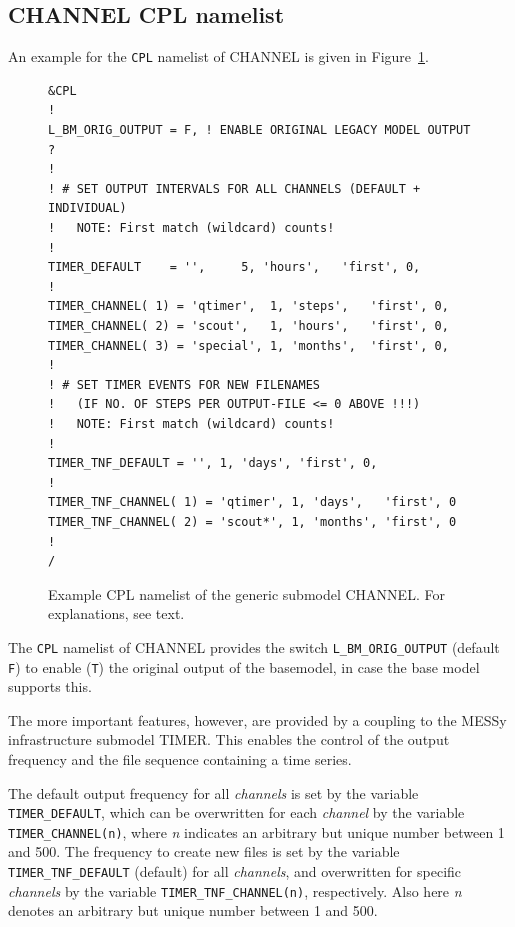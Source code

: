\documentclass[twoside]{article}
\begin{document}
\subsection{CHANNEL CPL namelist}
\label{sec:channelCPL}
%
An example for the {\tt CPL} namelist of CHANNEL is given in
Figure~\ref{fig:channel_cpl}.
%

\begin{figure}[h!]
\begin{center}
\begin{minipage}{0.6\textwidth}
\footnotesize
\begin{verbatim}
&CPL
!
L_BM_ORIG_OUTPUT = F, ! ENABLE ORIGINAL LEGACY MODEL OUTPUT ?
!
! # SET OUTPUT INTERVALS FOR ALL CHANNELS (DEFAULT + INDIVIDUAL)
!   NOTE: First match (wildcard) counts!
!
TIMER_DEFAULT    = '',     5, 'hours',   'first', 0,
!
TIMER_CHANNEL( 1) = 'qtimer',  1, 'steps',   'first', 0,
TIMER_CHANNEL( 2) = 'scout',   1, 'hours',   'first', 0,
TIMER_CHANNEL( 3) = 'special', 1, 'months',  'first', 0,
!
! # SET TIMER EVENTS FOR NEW FILENAMES
!   (IF NO. OF STEPS PER OUTPUT-FILE <= 0 ABOVE !!!)
!   NOTE: First match (wildcard) counts!
!
TIMER_TNF_DEFAULT = '', 1, 'days', 'first', 0,
!
TIMER_TNF_CHANNEL( 1) = 'qtimer', 1, 'days',   'first', 0
TIMER_TNF_CHANNEL( 2) = 'scout*', 1, 'months', 'first', 0
!
/
\end{verbatim}
\end{minipage}
\end{center}
\caption{Example CPL namelist of the generic submodel CHANNEL.
For explanations, see text.}%
\label{fig:channel_cpl}
\end{figure}
%

The {\tt CPL} namelist
of CHANNEL provides the switch {\tt L\_BM\_ORIG\_OUTPUT}
(default {\tt F}) to enable ({\tt T}) the original output of the basemodel,
in case the base model supports this.

The more important features, however, are provided by a coupling to the
MESSy infrastructure submodel TIMER. This enables the control of the
output frequency and the file sequence containing a time series.

The default output frequency for all {\it channels} is set by the variable
{\tt TIMER\_DEFAULT}, which can be overwritten for each {\it channel} by
the variable {\tt TIMER\_CHANNEL(n)}, where {\it n} indicates an arbitrary
but unique number between 1 and 500. The frequency to create new files
is set by the variable {\tt TIMER\_TNF\_DEFAULT} (default) for all
{\it channels}, and overwritten for specific {\it channels} by the
variable {\tt TIMER\_TNF\_CHANNEL(n)}, respectively. Also here {\it n}
denotes an arbitrary but unique number between 1 and 500.
\end{document}
